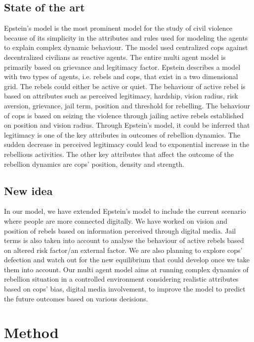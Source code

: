 \documentclass[a4paper,11pt]{article}
\begin{document}
\subsection{State of the art}
Epstein's model \cite{epstein2002modeling} is the most prominent model for the study of civil violence because of its simplicity in the attributes and rules used for modeling the agents to explain complex dynamic behaviour. The model used centralized cops against decentralized civilians as reactive agents. The entire multi agent model is primarily based on grievance and legitimacy factor. Epstein describes a model with two types of agents, i.e. rebels and cops, that exist in a two dimensional grid. The rebels could either be active or quiet. The behaviour of active rebel is based on attributes such as perceived legitimacy, hardship, vision radius, risk aversion, grievance, jail term, position and threshold for rebelling. The behaviour of cops is based on seizing the violence through jailing active rebels established on position and vision radius. Through Epstein's model, it could be inferred that legitimacy is one of the key attributes in outcomes of rebellion dynamics. The sudden decrease in perceived legitimacy could lead to exponential increase in the rebellious activities. The other key attributes that affect the outcome of the rebellion dynamics are cops' position, density and strength.
 
\subsection{New idea}

In our model, we have extended Epstein's model to include the current scenario where people are more connected digitally. We have worked on vision and position of rebels based on information perceived through digital media. Jail terms is also taken into account to analyse the behaviour of active rebels based on altered risk factor/an external factor. We are also planning to explore cops' defection and watch out for the new equilibrium that could develop once we take them into account. Our multi agent model aims at running complex dynamics of rebellion situation in a controlled environment considering realistic attributes based on cops' bias, digital media involvement, to improve the model to predict the future outcomes based on various decisions.

\section{Method}
\end{document}

